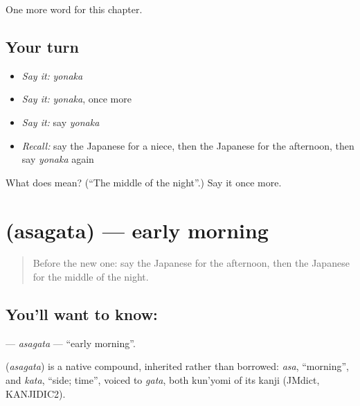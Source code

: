 \begin{grammarlens}[title={What you've built}]
One more word for this chapter.
\end{grammarlens}

\subsection*{Your turn}
\begin{itemize}
\raggedright
  \item \emph{Say it:} \emph{yonaka}
  \item \emph{Say it:} \emph{yonaka}, once more
  \item \emph{Say it:} say \emph{yonaka}
  \item \emph{Recall:} say the Japanese for a niece, then the Japanese for the afternoon, then say \emph{yonaka} again
\end{itemize}

\begin{tcolorbox}[breakable,colback=teal!4,colframe=teal!35!black,title={Before you move on}]
What does  mean? (\textquotedblleft{}The middle of the night\textquotedblright{}.) Say it once more.
\end{tcolorbox}
\section[\texorpdfstring{\ja{あさがた} (asagata)}{あさがた (asagata)}]{ (asagata) — early morning}

\label{lesson:JA-C72-asagata}



\begin{quote}
Before the new one: say the Japanese for the afternoon, then the Japanese for the middle of the night.
\end{quote}

\subsection*{You'll want to know: }
\textbf{} — \emph{asagata} — \textquotedblleft{}early morning\textquotedblright{}.

\begin{cousinweb}
\textbf{} (\emph{asagata}) is a native compound, inherited rather than borrowed: \emph{asa}, \textquotedblleft{}morning\textquotedblright{}, and \emph{kata}, \textquotedblleft{}side; time\textquotedblright{}, voiced to \emph{gata}, both kun'yomi of its kanji (JMdict, KANJIDIC2).
\end{cousinweb}


